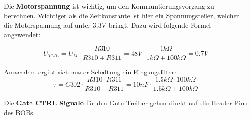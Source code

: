 
Die \textbf{Motorspannung} ist wichtig, um den Kommuntierungsvorgang zu berechnen. Wichtiger als die Zeitkonstante ist hier ein Spannungsteiler, welcher die Motorspannung auf unter 3.3V bringt. Dazu wird folgende Formel angewendet:

\begin{equation}
U_{TMC} = U_M \cdot \frac{R310}{R310 + R311} = 48V \cdot \frac{1k\Omega}{1k\Omega + 100k\Omega} = 0.7V
\end{equation}

Ausserdem ergibt sich aus er Schaltung ein Eingangsfilter:
\begin{equation}
\tau = C302 \cdot \frac{R310 \cdot R311}{R310 + R311} = 10nF \cdot \frac{1.5k\Omega \cdot 100k\Omega}{1.5k\Omega + 100k\Omega}
\end{equation}
\cite{andy_aka_capacitor_2013}


Die \textbf{Gate-CTRL-Signale} für den Gate-Treiber gehen direkt auf die Header-Pins des BOBs.

%
%
%

